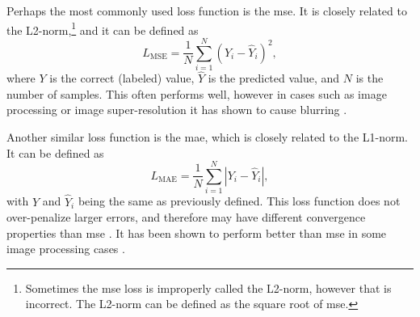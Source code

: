 Perhaps the most commonly used loss function is the \gls{mse}. It is closely related to the L2-norm,\footnote{Sometimes the \gls{mse} loss is improperly called the L2-norm, however that is incorrect. The L2-norm can be defined as the square root of \gls{mse}. } and it can be defined as
\begin{equation}
    \label{eq:lossmse}
    L_{\text{MSE}} = \frac{1}{N} \sum_{i=1}^N(Y_i - \hat{Y}_i)^2,
\end{equation}
where $Y$ is the correct (labeled) value,  $\hat{Y}$ is the predicted value, and $N$ is the number of samples. This often performs well, however in cases such as image processing or image super-resolution it has shown to cause blurring \cite{7797130}.

Another similar loss function is the \gls{mae}, which is closely related to the L1-norm. It can be defined as
\begin{equation}
    \label{eq:lossmae}
    L_{\text{MAE}} = \frac{1}{N} \sum_{i=1}^N |Y_i - \hat{Y}_i|,
\end{equation}
with $Y$ and $\hat{Y}_i$ being the same as previously defined. This loss function does not over-penalize larger errors, and therefore may have different convergence properties than \gls{mse} \cite{7797130}. It has been shown to perform better than \gls{mse} in some image processing cases \cite{7797130,10.1002/mp.13713}. 


